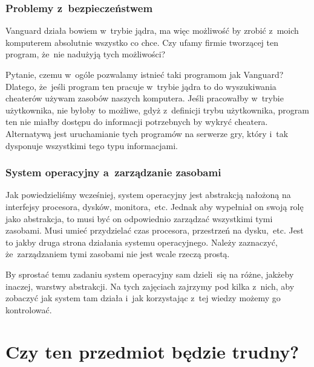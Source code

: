 \documentclass[10pt,t]{beamer}
\begin{document}
\begin{frame}
  \frametitle{Problemy z~bezpieczeństwem}


  Vanguard działa bowiem w~trybie jądra, ma więc możliwość by zrobić
  z~moich komputerem absolutnie wszystko co chce. Czy ufamy firmie
  tworzącej ten program, że~nie nadużyją tych możliwości?

  Pytanie, czemu w~ogóle pozwalamy istnieć taki programom jak Vanguard?
  Dlatego, że~jeśli program ten pracuje w~trybie jądra to do wyszukiwania
  cheaterów używam zasobów \alert{naszych} komputera. Jeśli pracowałby
  w~trybie użytkownika, nie byłoby to możliwe, gdyż z~definicji trybu
  użytkownika, program ten nie miałby dostępu do informacji potrzebnych by
  wykryć cheatera. Alternatywą jest uruchamianie tych programów na serwerze
  gry, który i~tak dysponuje wszystkimi tego typu informacjami.


\end{frame}





\begin{frame}
  \frametitle{System operacyjny a~zarządzanie zasobami}


  Jak powiedzieliśmy wcześniej, system operacyjny jest abstrakcją nałożoną
  na interfejsy procesora, dysków, monitora,~etc. Jednak aby wypełniał
  on swoją rolę jako abstrakcja, to musi być on odpowiednio
  \alert{zarządzać} wszystkimi tymi zasobami. Musi umieć przydzielać czas
  procesora, przestrzeń na dysku,~etc. Jest to jakby druga strona działania
  systemu operacyjnego. Należy zaznaczyć, że~zarządzaniem tymi zasobami nie
  jest wcale rzeczą prostą.

  By sprostać temu zadaniu system operacyjny sam dzieli~się na różne,
  jakżeby inaczej, warstwy abstrakcji. Na tych zajęciach zajrzymy pod kilka
  z~nich, aby zobaczyć jak system tam działa i~jak korzystając z~tej wiedzy
  możemy go kontrolować.

\end{frame}










\section{Czy ten przedmiot będzie trudny?}
\end{document}
